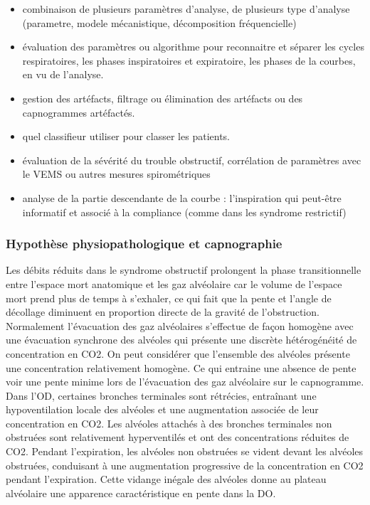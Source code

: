 \documentclass[12pt,]{article}
\begin{document}
\begin{itemize}
\item
  combinaison de plusieurs paramètres d'analyse, de plusieurs type
  d'analyse (parametre, modele mécanistique, décomposition
  fréquencielle)
\item
  évaluation des paramètres ou algorithme pour reconnaitre et séparer
  les cycles respiratoires, les phases inspiratoires et expiratoire, les
  phases de la courbes, en vu de l'analyse.
\item
  gestion des artéfacts, filtrage ou élimination des artéfacts ou des
  capnogrammes artéfactés.
\item
  quel classifieur utiliser pour classer les patients.
\item
  évaluation de la sévérité du trouble obstructif, corrélation de
  paramètres avec le VEMS ou autres mesures spirométriques
\item
  analyse de la partie descendante de la courbe : l'inspiration qui
  peut-être informatif et associé à la compliance (comme dans les
  syndrome restrictif)
\end{itemize}

\hypertarget{hypothuxe8se-physiopathologique-et-capnographie}{%
\subsubsection{Hypothèse physiopathologique et
capnographie}\label{hypothuxe8se-physiopathologique-et-capnographie}}

Les débits réduits dans le syndrome obstructif prolongent la phase
transitionnelle entre l'espace mort anatomique et les gaz alvéolaire car
le volume de l'espace mort prend plus de temps à s'exhaler, ce qui fait
que la pente et l'angle de décollage diminuent en proportion directe de
la gravité de l'obstruction. Normalement l'évacuation des gaz
alvéolaires s'effectue de façon homogène avec une évacuation synchrone
des alvéoles qui présente une discrète hétérogénéité de concentration en
CO2. On peut considérer que l'ensemble des alvéoles présente une
concentration relativement homogène. Ce qui entraine une absence de
pente voir une pente minime lors de l'évacuation des gaz alvéolaire sur
le capnogramme. Dans l'OD, certaines bronches terminales sont rétrécies,
entraînant une hypoventilation locale des alvéoles et une augmentation
associée de leur concentration en CO2. Les alvéoles attachés à des
bronches terminales non obstruées sont relativement hyperventilés et ont
des concentrations réduites de CO2. Pendant l'expiration, les alvéoles
non obstruées se vident devant les alvéoles obstruées, conduisant à une
augmentation progressive de la concentration en CO2 pendant
l'expiration. Cette vidange inégale des alvéoles donne au plateau
alvéolaire une apparence caractéristique en pente dans la DO.
\end{document}
